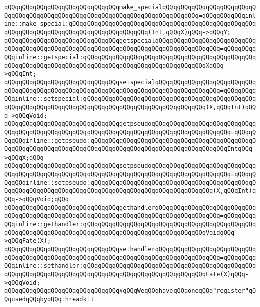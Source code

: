 \verb|qQQqqQQqqQQqqQQqqQQqqQQqqQQqqQQqmake_specialqQQqqQQqqQQqqQQqqQQqqQQqqQQqqQQqqQQqqQQqqQQqqQQqqQQqqQQqqQQqqQQqqQQqqQQqqQQqqQQq=qQQqqQQqqQQqinline::make_special:qQQqqQQqqQQqqQQqqQQqqQQqqQQqqQQqqQQqqQQqqQQqqQQqqQQqqQQqqQQqqQQqqQQqqQQqqQQqqQQqqQQqqQQqqQQq(Int,qQQqX)qQQq->qQQqY;|\newline
\newline
\verb|qQQqqQQqqQQqqQQqqQQqqQQqqQQqqQQqgetspecialqQQqqQQqqQQqqQQqqQQqqQQqqQQqqQQqqQQqqQQqqQQqqQQqqQQqqQQqqQQqqQQqqQQqqQQqqQQqqQQqqQQqqQQq=qQQqqQQqqQQqinline::getspecial:qQQqqQQqqQQqqQQqqQQqqQQqqQQqqQQqqQQqqQQqqQQqqQQqqQQqqQQqqQQqqQQqqQQqqQQqqQQqqQQqqQQqqQQqqQQqqQQqqQQqqQQqXqQQq->qQQqInt;|\newline
\verb|qQQqqQQqqQQqqQQqqQQqqQQqqQQqqQQqsetspecialqQQqqQQqqQQqqQQqqQQqqQQqqQQqqQQqqQQqqQQqqQQqqQQqqQQqqQQqqQQqqQQqqQQqqQQqqQQqqQQqqQQqqQQq=qQQqqQQqqQQqinline::setspecial:qQQqqQQqqQQqqQQqqQQqqQQqqQQqqQQqqQQqqQQqqQQqqQQqqQQqqQQqqQQqqQQqqQQqqQQqqQQqqQQqqQQqqQQqqQQqqQQqqQQqqQQq(X,qQQqInt)qQQq->qQQqVoid;|\newline
\newline
\verb|qQQqqQQqqQQqqQQqqQQqqQQqqQQqqQQqgetpseudoqQQqqQQqqQQqqQQqqQQqqQQqqQQqqQQqqQQqqQQqqQQqqQQqqQQqqQQqqQQqqQQqqQQqqQQqqQQqqQQqqQQqqQQqqQQq=qQQqqQQqqQQqinline::getpseudo:qQQqqQQqqQQqqQQqqQQqqQQqqQQqqQQqqQQqqQQqqQQqqQQqqQQqqQQqqQQqqQQqqQQqqQQqqQQqqQQqqQQqqQQqqQQqqQQqqQQqqQQqqQQqIntqQQq->qQQqX;qQQq|\newline
\verb|qQQqqQQqqQQqqQQqqQQqqQQqqQQqqQQqsetpseudoqQQqqQQqqQQqqQQqqQQqqQQqqQQqqQQqqQQqqQQqqQQqqQQqqQQqqQQqqQQqqQQqqQQqqQQqqQQqqQQqqQQqqQQqqQQq=qQQqqQQqqQQqinline::setpseudo:qQQqqQQqqQQqqQQqqQQqqQQqqQQqqQQqqQQqqQQqqQQqqQQqqQQqqQQqqQQqqQQqqQQqqQQqqQQqqQQqqQQqqQQqqQQqqQQqqQQqqQQq(X,qQQqInt)qQQq->qQQqVoid;qQQq|\newline
\newline
\verb|qQQqqQQqqQQqqQQqqQQqqQQqqQQqqQQqgethandlerqQQqqQQqqQQqqQQqqQQqqQQqqQQqqQQqqQQqqQQqqQQqqQQqqQQqqQQqqQQqqQQqqQQqqQQqqQQqqQQqqQQqqQQq=qQQqqQQqqQQqinline::gethandler:qQQqqQQqqQQqqQQqqQQqqQQqqQQqqQQqqQQqqQQqqQQqqQQqqQQqqQQqqQQqqQQqqQQqqQQqqQQqqQQqqQQqqQQqqQQqqQQqqQQqqQQqVoidqQQq->qQQqFate(X);|\newline
\verb|qQQqqQQqqQQqqQQqqQQqqQQqqQQqqQQqsethandlerqQQqqQQqqQQqqQQqqQQqqQQqqQQqqQQqqQQqqQQqqQQqqQQqqQQqqQQqqQQqqQQqqQQqqQQqqQQqqQQqqQQqqQQq=qQQqqQQqqQQqinline::sethandler:qQQqqQQqqQQqqQQqqQQqqQQqqQQqqQQqqQQqqQQqqQQqqQQqqQQqqQQqqQQqqQQqqQQqqQQqqQQqqQQqqQQqqQQqqQQqqQQqqQQqqQQqFate(X)qQQq->qQQqVoid;|\newline
\newline
\verb|qQQqqQQqqQQqqQQqqQQqqQQqqQQqqQQq#qQQqWeqQQqhaveqQQqoneqQQq"register"qQQqusedqQQqbyqQQqthreadkit|\newline
